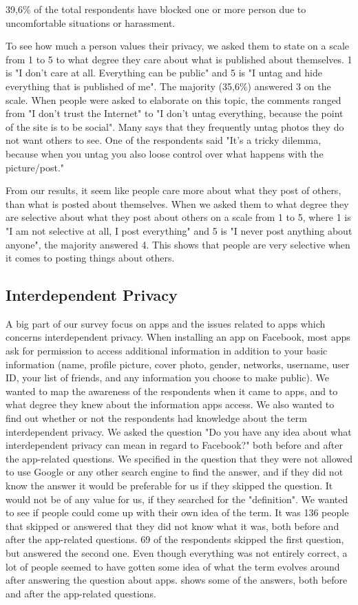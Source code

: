 39,6\% of the total respondents have blocked one or more person due to uncomfortable situations or harassment. 

To see how much a person values their privacy, we asked them to state on a scale from 1 to 5 to what degree they care about what is published about themselves. 1 is "I don't care at all. Everything can be public" and 5 is "I untag and hide everything that is published of me". The majority (35,6\%) answered 3 on the scale.  When people were asked to elaborate on this topic, the comments ranged from "I don't trust the Internet" to "I don't untag everything, because the point of the site is to be social". Many says that they frequently untag photos they do not want others to see. One of the respondents said "It's a tricky dilemma, because when you untag you also loose control over what happens with the picture/post."

From our results, it seem like people care more about what they post of others, than what is posted about themselves. When we asked them to what degree they are selective about what they post about others on a scale from 1 to 5, where 1 is "I am not selective at all, I post everything" and 5 is "I never post anything about anyone", the majority answered 4. This shows that people are very selective when it comes to posting things about others.

\subsection{Interdependent Privacy}

A big part of our survey focus on apps and the issues related to apps which concerns interdependent privacy. When installing an app on Facebook, most apps ask for permission to access additional information in addition to your basic information (name, profile picture, cover photo, gender, networks, username, user ID, your list of friends, and any information you choose to make public). We wanted to map the awareness of the respondents when it came to apps, and to what degree they knew about the information apps access. We also wanted to find out whether or not the respondents had knowledge about the term interdependent privacy. We asked the question "Do you have any idea about what interdependent privacy can mean in regard to Facebook?" both before and after the app-related questions. We specified in the question that they were not allowed to use Google or any other search engine to find the answer, and if they did not know the answer it would be preferable for us if they skipped the question. It would not be of any value for us, if they searched for the "definition". We wanted to see if people could come up with their own idea of the term. It was 136 people that skipped or answered that they did not know what it was, both before and after the app-related questions. 69 of the respondents skipped the first question, but answered the second one. Even though everything was not entirely correct, a lot of people seemed to have gotten some idea of what the term evolves around after answering the question about apps.  shows some of the answers, both before and after the app-related questions.   

